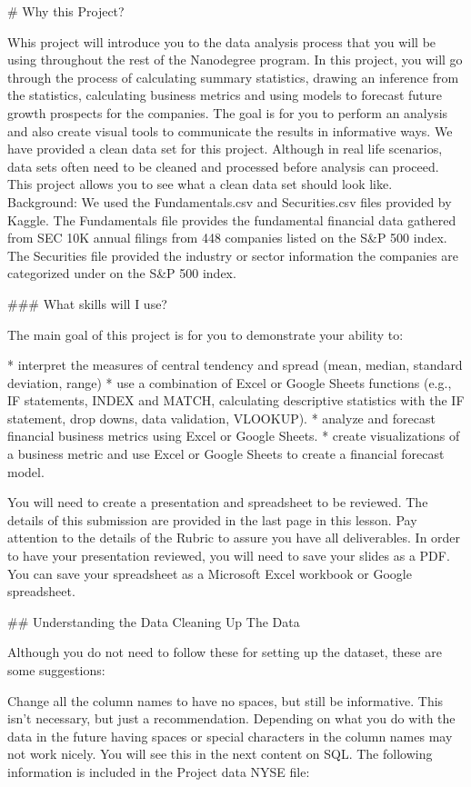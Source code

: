 # Why this Project? 

Whis project will introduce you to the data analysis process that you will be using throughout the rest of the Nanodegree program. In this project, you will go through the process of calculating summary statistics, drawing an inference from the statistics, calculating business metrics and using models to forecast future growth prospects for the companies. The goal is for you to perform an analysis and also create visual tools to communicate the results in informative ways.
We have provided a clean data set for this project. Although in real life scenarios, data sets often need to be cleaned and processed before analysis can proceed. This project allows you to see what a clean data set should look like.
Background: We used the Fundamentals.csv and Securities.csv files provided by Kaggle. The Fundamentals file provides the fundamental financial data gathered from SEC 10K annual filings from 448 companies listed on the S&P 500 index. The Securities file provided the industry or sector information the companies are categorized under on the S&P 500 index.

### What skills will I use?

The main goal of this project is for you to demonstrate your ability to:

* interpret the measures of central tendency and spread (mean, median, standard deviation, range)
* use a combination of Excel or Google Sheets functions (e.g., IF statements, INDEX and MATCH, calculating descriptive statistics with the IF statement, drop downs, data validation, VLOOKUP).
* analyze and forecast financial business metrics using Excel or Google Sheets.
* create visualizations of a business metric and use Excel or Google Sheets to create a financial forecast model.

You will need to create a presentation and spreadsheet to be reviewed. The details of this submission are provided in the last page in this lesson. Pay attention to the details of the Rubric to assure you have all deliverables. In order to have your presentation reviewed, you will need to save your slides as a PDF. You can save your spreadsheet as a Microsoft Excel workbook or Google spreadsheet.

## Understanding the Data
Cleaning Up The Data

Although you do not need to follow these for setting up the dataset, these are some suggestions:

Change all the column names to have no spaces, but still be informative. This isn’t necessary, but just a recommendation. Depending on what you do with the data in the future having spaces or special characters in the column names may not work nicely. You will see this in the next content on SQL. The following information is included in the Project data NYSE file:

